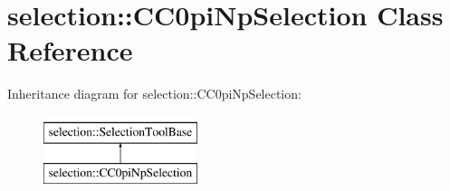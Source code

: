 \hypertarget{classselection_1_1CC0piNpSelection}{\section{selection\-:\-:C\-C0pi\-Np\-Selection Class Reference}
\label{classselection_1_1CC0piNpSelection}
}
Inheritance diagram for selection\-:\-:C\-C0pi\-Np\-Selection\-:\begin{figure}[H]
\begin{center}
\leavevmode
\includegraphics[height=2.000000cm]{classselection_1_1CC0piNpSelection}
\end{center}
\end{figure}
